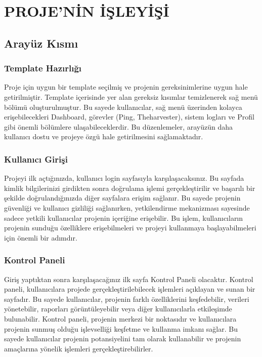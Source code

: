 \section{PROJE'NİN İŞLEYİŞİ}
\subsection{Arayüz Kısmı }
\subsubsection{Template Hazırlığı}
Proje için uygun bir template seçilmiş ve projenin gereksinimlerine uygun hale getirilmiştir. Template içerisinde yer alan gereksiz kısımlar temizlenerek sağ menü bölümü oluşturulmuştur. Bu sayede kullanıcılar, sağ menü üzerinden kolayca erişebilecekleri Dashboard, görevler (Ping, Theharvester), sistem logları ve Profil gibi önemli bölümlere ulaşabileceklerdir. Bu düzenlemeler, arayüzün daha kullanıcı dostu ve projeye özgü hale getirilmesini sağlamaktadır.
\subsubsection{Kullanıcı Girişi}
Projeyi ilk açtığınızda, kullanıcı login sayfasıyla karşılaşacaksınız. Bu sayfada kimlik bilgilerinizi girdikten sonra doğrulama işlemi gerçekleştirilir ve başarılı bir şekilde doğrulandığınızda diğer sayfalara erişim sağlanır. Bu sayede projenin güvenliği ve kullanıcı gizliliği sağlanırken, yetkilendirme mekanizması sayesinde sadece yetkili kullanıcılar projenin içeriğine erişebilir. Bu işlem, kullanıcıların projenin sunduğu özelliklere erişebilmeleri ve projeyi kullanmaya başlayabilmeleri için önemli bir adımdır.
\subsubsection{Kontrol Paneli}
Giriş yaptıktan sonra karşılaşacağınız ilk sayfa Kontrol Paneli olacaktır. Kontrol paneli, kullanıcılara projede gerçekleştirilebilecek işlemleri açıklayan ve sunan bir sayfadır. Bu sayede kullanıcılar, projenin farklı özelliklerini keşfedebilir, verileri yönetebilir, raporları görüntüleyebilir veya diğer kullanıcılarla etkileşimde bulunabilir. Kontrol paneli, projenin merkezi bir noktasıdır ve kullanıcılara projenin sunmuş olduğu işlevselliği keşfetme ve kullanma imkanı sağlar. Bu sayede kullanıcılar projenin potansiyelini tam olarak kullanabilir ve projenin amaçlarına yönelik işlemleri gerçekleştirebilirler.
